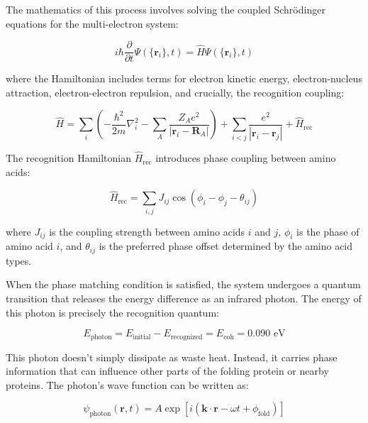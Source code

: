 \documentclass[12pt,a4paper]{report}
\begin{document}
The mathematics of this process involves solving the coupled Schrödinger equations for the multi-electron system:

\begin{equation}
i\hbar \frac{\partial}{\partial t} \Psi(\{\mathbf{r}_i\}, t) = \hat{H} \Psi(\{\mathbf{r}_i\}, t)
\end{equation}

where the Hamiltonian includes terms for electron kinetic energy, electron-nucleus attraction, electron-electron repulsion, and crucially, the recognition coupling:

\begin{equation}
\hat{H} = \sum_i \left(-\frac{\hbar^2}{2m} \nabla_i^2 - \sum_A \frac{Z_A e^2}{|\mathbf{r}_i - \mathbf{R}_A|}\right) + \sum_{i<j} \frac{e^2}{|\mathbf{r}_i - \mathbf{r}_j|} + \hat{H}_{\text{rec}}
\end{equation}

The recognition Hamiltonian $\hat{H}_{\text{rec}}$ introduces phase coupling between amino acids:

\begin{equation}
\hat{H}_{\text{rec}} = \sum_{i,j} J_{ij} \cos(\phi_i - \phi_j - \theta_{ij})
\end{equation}

where $J_{ij}$ is the coupling strength between amino acids $i$ and $j$, $\phi_i$ is the phase of amino acid $i$, and $\theta_{ij}$ is the preferred phase offset determined by the amino acid types.

When the phase matching condition is satisfied, the system undergoes a quantum transition that releases the energy difference as an infrared photon. The energy of this photon is precisely the recognition quantum:

\begin{equation}
E_{\text{photon}} = E_{\text{initial}} - E_{\text{recognized}} = E_{\text{coh}} = 0.090 \text{ eV}
\end{equation}

This photon doesn't simply dissipate as waste heat. Instead, it carries phase information that can influence other parts of the folding protein or nearby proteins. The photon's wave function can be written as:

\begin{equation}
\psi_{\text{photon}}(\mathbf{r}, t) = A \exp\left[i\left(\mathbf{k} \cdot \mathbf{r} - \omega t + \phi_{\text{fold}}\right)\right]
\end{equation}
\end{document}
